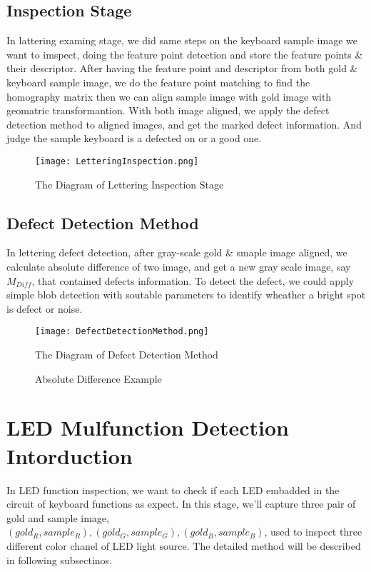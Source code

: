 	\subsection{Inspection Stage}
		In lattering examing stage, we did same steps on the keyboard sample image we want to imspect, doing the feature point detection and store the feature points \& their descriptor.
		After having the feature point and descriptor from both gold \& keyboard sample image, we do the feature point matching to find the homography matrix then we can align sample image with gold image with geomatric transformantion. 
		With both image aligned, we apply the defect detection method to aligned images, and get the marked defect information.
		And judge the sample keyboard is a defected on or a good one.
		\begin{figure}[H]
			\texttt{[image: LetteringInspection.png]}
			\caption{The Diagram of Lettering Inspection Stage}
			\label{fig:LetteringInspection}
		\end{figure}

	\subsection{Defect Detection Method}
		In lettering defect detection, after gray-scale gold \& smaple image aligned, we calculate absolute difference of two image, and get a new gray scale image, say $M_{Diff}$, that contained defects information.
		To detect the defect, we could apply simple blob detection with soutable parameters to identify wheather a bright spot is defect or noise.
		\begin{figure}[H]
			\texttt{[image: DefectDetectionMethod.png]}
			\caption{The Diagram of Defect Detection Method}
			\label{fig:DefectDetectionMethod}
		\end{figure}
		\begin{figure}[H]
			
			\caption{Absolute Difference Example}
			\label{fig:AbsoluteDifferenceResult}
		\end{figure}

\section{LED Mulfunction Detection Intorduction}
	In LED function inspection, we want to check if each LED embadded in the circuit of keyboard functions as expect.
	In this stage, we'll capture three pair of gold and sample image, $(gold_R, sample_R), (gold_G, sample_G), (gold_B, sample_B)$, used to inspect three different color chanel of LED light source.
	The detailed method will be described in following subsectinos.
